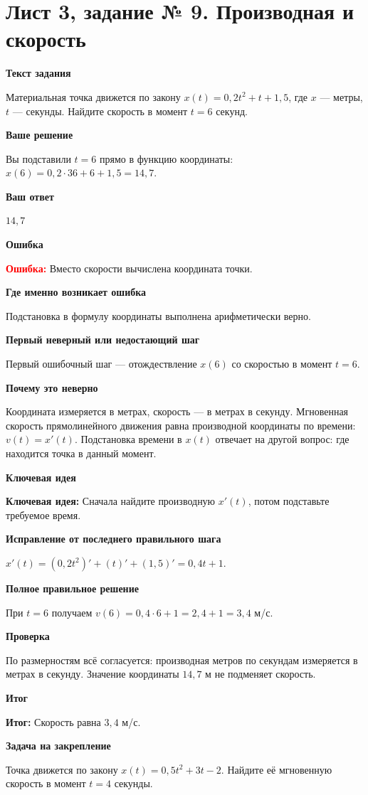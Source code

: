 \documentclass[11pt,a4paper]{article}
\newcommand{\Idea}{\textcolor{blue!60!black}{\textbf{Ключевая идея:}}}
\newcommand{\Res}{\textcolor{teal!60!black}{\textbf{Итог:}}}
\newcommand{\Heading}[2]{\par\medskip\textbf{#1}\par#2\par}
\begin{document}
\section*{Лист 3, задание № 9. Производная и скорость}
\Heading{Текст задания}{Материальная точка движется по закону $x(t)=0{,}2t^2+t+1{,}5$, где $x$ --- метры, $t$ --- секунды. Найдите скорость в момент $t=6$ секунд.}
\Heading{Ваше решение}{Вы подставили $t=6$ прямо в функцию координаты: $x(6)=0{,}2\cdot36+6+1{,}5=14{,}7$.}
\Heading{Ваш ответ}{$14{,}7$}
\Heading{Ошибка}{\textcolor{red}{\textbf{Ошибка:}} Вместо скорости вычислена координата точки.}
\Heading{Где именно возникает ошибка}{Подстановка в формулу координаты выполнена арифметически верно.}
\Heading{Первый неверный или недостающий шаг}{Первый ошибочный шаг --- отождествление $x(6)$ со скоростью в момент $t=6$.}
\Heading{Почему это неверно}{Координата измеряется в метрах, скорость --- в метрах в секунду. Мгновенная скорость прямолинейного движения равна производной координаты по времени: $v(t)=x\prime(t)$. Подстановка времени в $x(t)$ отвечает на другой вопрос: где находится точка в данный момент.}
\Heading{Ключевая идея}{\Idea{} Сначала найдите производную $x\prime(t)$, потом подставьте требуемое время.}
\Heading{Исправление от последнего правильного шага}{$x\prime(t)=(0{,}2t^2)\prime+(t)\prime+(1{,}5)\prime=0{,}4t+1$.}
\Heading{Полное правильное решение}{При $t=6$ получаем $v(6)=0{,}4\cdot6+1=2{,}4+1=3{,}4$ м/с.}
\Heading{Проверка}{По размерностям всё согласуется: производная метров по секундам измеряется в метрах в секунду. Значение координаты $14{,}7$ м не подменяет скорость.}
\Heading{Итог}{\Res{} Скорость равна $3{,}4$ м/с.}
\Heading{Задача на закрепление}{Точка движется по закону $x(t)=0{,}5t^2+3t-2$. Найдите её мгновенную скорость в момент $t=4$ секунды.}
\newpage
{}\label{task:3_10}
\end{document}

